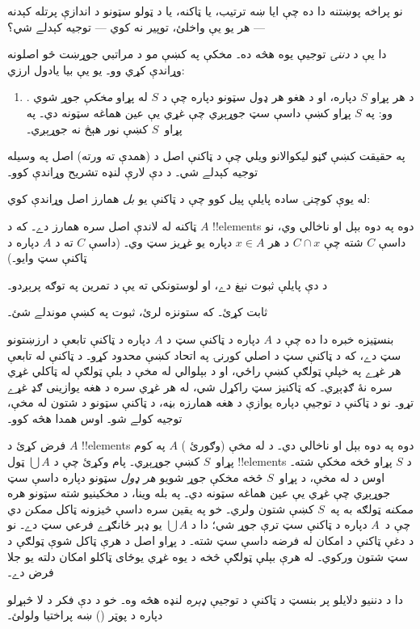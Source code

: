 \documentclass[../../../include/open-logic-section]{subfiles}
\begin{document}

نو پراخه پوښتنه دا ده چې ايا ښه ترتيب،
يا ټاکنه، يا د ټولو سټونو د اندازې
پرتله کېدنه — هر يو يې واخلئ، توپير
نه کوي — توجيه کېدلے شي؟

دا يې د \emph{دننۍ} توجيې يوه هڅه
ده۔ مخکې په 
کښې مو د مراتبي جوړښت څو اصلونه
وړاندې کړي وو۔ يو يې بيا يادول
ارزي:
\begin{enumerate}
	\item[] \stagesacc. د هر پړاو $S$ دپاره، او د هغو
	هر ډول سټونو دپاره چې د $S$ له پړاو
	\emph{مخکې} جوړ شوي وو: په $S$ پړاو
	کښې داسې سټ جوړېږي چې غړي يې
	عين هماغه سټونه دي۔ په
	پړاو~$S$ کښې نور هېڅ نه جوړېږي۔
\end{enumerate}
په حقيقت کښې ګڼو ليکوالانو ويلي چې
د ټاکنې اصل د (همدې ته ورته) اصل
په وسيله توجيه کېدلے شي۔ د دې لارې
لنډه تشريح وړاندې کوو۔

له يوې کوچنۍ ساده پايلې پيل کوو چې
د ټاکنې يو \emph{بل} همارز اصل
وړاندې کوي:

\begin{thm}[په $\ZF$ کښې]
ټاکنه له لاندې اصل سره همارز دے۔
که د $A$ !!{element}s دوه په دوه بېل
او ناخالي وي، نو داسې $C$ شته چې
$C
\cap x$ د هر $x \in A$ دپاره
يو غړيز سټ وي۔ (داسې $C$ ته د
$A$ دپاره {د ټاکنې سټ} وايو۔)
\end{thm}

د دې پايلې ثبوت نېغ دے، او لوستونکي
ته يې د تمرين په توګه پرېږدو۔

\begin{prob}
ثابت کړئ۔ که ستونزه لرئ، ثبوت په
\cite[pp.~242--3]{Potter2004} کښې
موندلے شئ۔
\end{prob}

بنسټيزه خبره دا ده چې د $A$ دپاره
د ټاکنې سټ د $A$ دپاره د ټاکنې
تابعې د ارزښتونو سټ دے، که د ټاکنې سټ د اصلي کورنۍ په اتحاد کښې محدود کړو۔ د ټاکنې له تابعې هر غړے په خپلې ټولګې کښې راځي، او د بېلوالي له مخې د بلې ټولګې له ټاکلي غړي سره نۀ ګډېږي۔ که ټاکنيز سټ راکړل شي، له هر غړي سره د هغه يوازينی ګډ غړے تړو۔ نو د ټاکنې
د توجيې دپاره يوازې د هغه همارزه
بڼه، د ټاکنې سټونو د شتون له مخې،
توجيه کولے شو۔ اوس همدا هڅه کوو۔

فرض کړئ د $A$ !!{element}s دوه په
دوه بېل او ناخالي دي۔ د \stageshier{}
له مخې (وګورئ )
$A$ په کوم پړاو~$S$ کښې جوړېږي۔
پام وکړئ چې د $\bigcup A$ ټول
!!{element}s د $S$ پړاو څخه
مخکې شته۔ اوس د \stagesacc{}
له مخې، د پړاو~$S$ څخه مخکې
جوړ شويو \emph{هر ډول} سټونو
دپاره داسې سټ جوړېږي چې غړي
يې عين هماغه سټونه دي۔ په بله
وينا، د مخکينيو شته سټونو هره
\emph{ممکنه} ټولګه به په~$S$
کښې شتون ولري۔ خو په يقين سره
داسې څيزونه ټاکل \emph{ممکن}
دي چې د~$A$ دپاره د ټاکنې سټ
ترې جوړ شي؛ دا د $\bigcup A$
يو ډېر ځانګړے فرعي سټ دے۔ نو
د دغې ټاکنې د امکان له فرضه داسې سټ شته۔ د پړاو اصل د هرې ټاکل شوې ټولګې د سټ شتون ورکوي۔ له هرې بېلې ټولګې څخه د يوه غړي يوځای ټاکلو امکان دلته يو جلا فرض دے۔

دا د دننيو دلايلو پر بنسټ د
ټاکنې د توجيې \emph{ډېره}
لنډه هڅه وه۔ خو د دې فکر د لا
څېړلو دپاره د پوټر
(\citeyear[\S14.8]{Potter2004})
ښه پراختيا ولولئ۔
\end{document}
